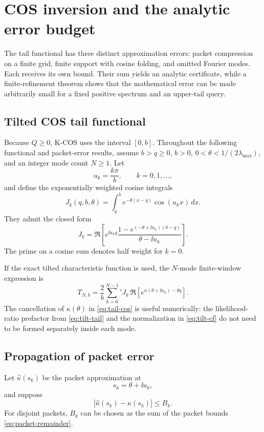 \chapter{COS inversion and the analytic error budget}\label{ch:inversion}
The tail functional has three distinct approximation errors: packet
compression on a finite grid, finite support with cosine folding, and omitted
Fourier modes. Each receives its own bound. Their sum yields an analytic
certificate, while a finite-refinement theorem shows that the mathematical
error can be made arbitrarily small for a fixed positive spectrum and an
upper-tail query.
\section{Tilted COS tail functional}

Because $Q\ge0$, K-COS uses the interval $[0,b]$.  Throughout the
following functional and packet-error results, assume $b>q\ge0$, $b>0$,
$0<\theta<1/(2\lambda_{\max})$, and an integer mode count $N\ge1$.  Let
\[
u_k=\frac{k\pi}{b},
\qquad k=0,1,\ldots,
\]
and define the exponentially weighted cosine integrals
\begin{equation}
J_k(q,b,\theta)
=\int_q^b e^{-\theta(x-q)}\cos(u_kx)\,dx.
\label{eq:J-def}
\end{equation}
They admit the closed form
\begin{equation}
J_k
=\Re\left[
 e^{\ii u_k q}
 \frac{1-e^{(-\theta+\ii u_k)(b-q)}}{\theta-\ii u_k}
\right].
\label{eq:J-formula}
\end{equation}
The prime on a cosine sum denotes half weight for $k=0$.

If the exact tilted characteristic function is used, the $N$-mode finite-window expression is
\begin{equation}
T_{N,b}
=\frac{2}{b}\sum_{k=0}^{N-1}{}'
J_k\,
\Re\left[e^{\kappa(\theta+\ii u_k)-\theta q}\right].
\label{eq:tail-cos}
\end{equation}
The cancellation of $\kappa(\theta)$ in \eqref{eq:tail-cos} is useful numerically: the likelihood-ratio prefactor from \eqref{eq:tilt-tail} and the normalization in \eqref{eq:tilt-cf} do not need to be formed separately inside each mode.

\section{Propagation of packet error}

Let $\widehat\kappa(s_k)$ be the packet approximation at
\[
s_k=\theta+\ii u_k,
\]
and suppose
\begin{equation}
|\widehat\kappa(s_k)-\kappa(s_k)|\le B_k.
\label{eq:Bk}
\end{equation}
For disjoint packets, $B_k$ can be chosen as the sum of the packet bounds \eqref{eq:packet-remainder}.

